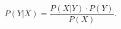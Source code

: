 \begin{equation}
\label{eq:bayestheorem}
P(Y | X) = \frac{P(X | Y) \cdot P(Y)}{P(X)}.
\end{equation}
